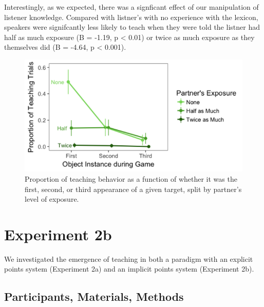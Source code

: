\documentclass[10pt, letterpaper]{article}
\newenvironment{CodeChunk}{}{}
\begin{document}
Interestingly, as we expected, there was a signficant effect of our
manipulation of listener knowledge. Compared with listner's with no
experience with the lexicon, speakers were signifcantly less likely to
teach when they were told the listner had half as much exposure (B =
-1.19, p \textless{} 0.01) or twice as much exposure as they themselves
did (B = -4.64, p \textless{} 0.001).

\begin{CodeChunk}
\captionsetup{width=0.8\columnwidth}\begin{figure}[H]

{\centering \includegraphics{figs/image3-1} 

}

\caption[Proportion of teaching behavior as a function of whether it was the first, second, or third appearance of a given target, split by partner's level of exposure]{Proportion of teaching behavior as a function of whether it was the first, second, or third appearance of a given target, split by partner's level of exposure.}\label{fig:image3}
\end{figure}
\end{CodeChunk}

\section{Experiment 2b}\label{experiment-2b}

We investigated the emergence of teaching in both a paradigm with an
explicit points system (Experiment 2a) and an implicit points system
(Experiment 2b).

\subsection{Participants, Materials,
Methods}\label{participants-materials-methods-3}
\end{document}
